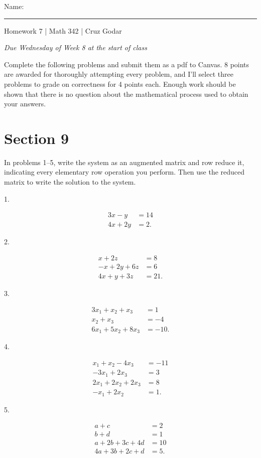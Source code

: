\documentclass{article}
\begin{document}
\Large Name: \rule{2in}{0.15mm} \hfill Homework 7 | Math 342 | Cruz Godar \vspace{4pt} \normalsize

\textit{Due Wednesday of Week 8 at the start of class}

Complete the following problems and submit them as a pdf to Canvas. 8 points are awarded for thoroughly attempting every problem, and I'll select three problems to grade on correctness for 4 points each. Enough work should be shown that there is no question about the mathematical process used to obtain your answers.

\section{Section 9}

In problems 1--5, write the system as an augmented matrix and row reduce it, indicating every elementary row operation you perform. Then use the reduced matrix to write the solution to the system.

1.

\begin{align*}
	3x - y &= 14\\
	4x + 2y &= 2.
\end{align*}

2.

\begin{align*}
	x + 2z &= 8\\
	-x + 2y + 6z &= 6\\
	4x + y + 3z &= 21.
\end{align*}

3.

\begin{align*}
	3x_1 + x_2 + x_3 &= 1\\
	x_2 + x_3 &= -4\\
	6x_1 + 5x_2 + 8x_3 &= -10.
\end{align*}

4.

\begin{align*}
	x_1 + x_2 - 4x_3 &= -11\\
	-3x_1 + 2x_3 &= 3\\
	2x_1 + 2x_2 + 2x_3 &= 8\\
	-x_1 + 2x_2 &= 1.
\end{align*}

5.

\begin{align*}
	a + c &= 2\\
	b + d &= 1\\
	a + 2b + 3c + 4d &= 10\\
	4a + 3b + 2c + d &= 5.
\end{align*}
\end{document}
